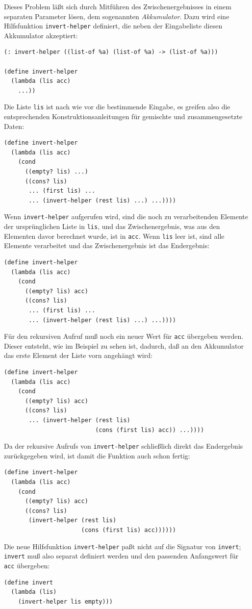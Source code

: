 Dieses Problem läßt sich durch Mitführen des Zwischenergebnisses in
einem separaten Parameter lösen, dem sogenannten
\textit{Akkumulator}.  Dazu wird eine
Hilfsfunktion \texttt{invert-helper} definiert, die neben der Eingabeliste
diesen Akkumulator akzeptiert:
%
\begin{verbatim}
(: invert-helper ((list-of %a) (list-of %a) -> (list-of %a)))

(define invert-helper
  (lambda (lis acc)
    ...))
\end{verbatim}
%
Die Liste \texttt{lis} ist nach wie vor die bestimmende Eingabe, es
greifen also die entsprechenden Konstruktionsanleitungen für gemischte
und zusammengesetzte Daten:
%
\begin{verbatim}
(define invert-helper
  (lambda (lis acc)
    (cond
      ((empty? lis) ...)
      ((cons? lis)
       ... (first lis) ...
       ... (invert-helper (rest lis) ...) ...))))
\end{verbatim}
%
Wenn \texttt{invert-helper} aufgerufen wird, sind die noch zu
verarbeitenden Elemente der ursprünglichen Liste in \texttt{lis}, und
das Zwischenergebnis, was aus den Elementen davor berechnet wurde, ist
in \texttt{acc}.  Wenn \texttt{lis} leer ist, sind alle Elemente
verarbeitet und das Zwischenergebnis ist das Endergebnis:
%
\begin{verbatim}
(define invert-helper
  (lambda (lis acc)
    (cond
      ((empty? lis) acc)
      ((cons? lis)
       ... (first lis) ...
       ... (invert-helper (rest lis) ...) ...))))
\end{verbatim}
%
Für den rekursiven Aufruf muß noch ein neuer Wert für \texttt{acc}
übergeben werden.  Dieser entsteht, wie im Beispiel zu sehen ist,
dadurch, daß an den Akkumulator das erste Element der Liste vorn
angehängt wird:
%
\begin{verbatim}
(define invert-helper
  (lambda (lis acc)
    (cond
      ((empty? lis) acc)
      ((cons? lis)
       ... (invert-helper (rest lis)
                          (cons (first lis) acc)) ...))))
\end{verbatim}
%
Da der rekursive Aufrufs von \texttt{invert-helper} schließlich direkt das
Endergebnis zurückgegeben wird, ist damit die Funktion auch schon fertig:
%
\begin{verbatim}
(define invert-helper
  (lambda (lis acc)
    (cond
      ((empty? lis) acc)
      ((cons? lis)
       (invert-helper (rest lis)
                      (cons (first lis) acc))))))
\end{verbatim}
%
Die neue Hilfsfunktion \texttt{invert-helper} paßt nicht auf die Signatur
von \texttt{invert}; \texttt{invert} muß also separat definiert werden
und den passenden Anfangswert für \texttt{acc} übergeben:
%
\begin{verbatim}
(define invert
  (lambda (lis)
    (invert-helper lis empty)))
\end{verbatim}
%

